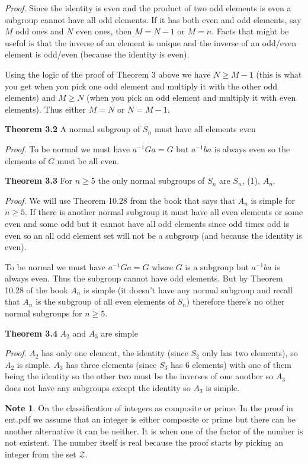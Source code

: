 \documentclass[aps,preprint,preprintnumbers,nofootinbib,showpacs,prd]{revtex4-1}
\begin{document}
{\it Proof}. Since the identity is even and the product of two odd elements is even a subgroup cannot have all odd elements. If it has both even and odd elements, say $M$ odd ones and $N$ even ones, then $M=N-1$ or $M = n$. Facts that might be useful is that the inverse of an element is unique and the inverse of an odd/even element is odd/even (because the identity is even).

Using the logic of the proof of Theorem 3 above we have $N \ge M - 1$ (this is what you get when you pick one odd element and multiply it with the other odd elements) and $M \ge N$ (when you pick an odd element and multiply it with even elements). Thus either $M = N$ or $N = M - 1$.

{\bf Theorem 3.2} A normal subgroup of $S_n$ must have all elements even

{\it Proof}. To be normal we must have $a^{-1}Ga = G$ but $a^{-1}ba$ is always even so the elements of $G$ must be all even.

{\bf Theorem 3.3} For $n \ge 5$ the only normal subgroups of $S_n$ are $S_n$, (1), $A_n$.

{\it Proof}. We will use Theorem 10.28 from the book that says that $A_n$ is simple for $n \ge 5$. If there is another normal subgroup it must have all even elements or some even and some odd but it cannot have all odd elements since odd times odd is even so an all odd element set will not be a subgroup (and because the identity is even).

To be normal we must have $a^{-1} G a = G$ where $G$ is a subgroup but $a^{-1} b a$ is always even. Thus the subgroup cannot have odd elements. But by Theorem 10.28 of the book $A_n$ is simple (it doesn't have any normal subgroup and recall that $A_n$ is the subgroup of all even elements of $S_n$) therefore there's no other normal subgroups for $n \ge 5$.

{\bf Theorem 3.4} $A_2$ and $A_3$ are simple

{\it Proof}. $A_2$ has only one element, the identity (since $S_2$ only has two elements), so $A_2$ is simple. $A_3$ has three elements (since $S_3$ has 6 elements) with one of them being the identity so the other two must be the inverses of one another so $A_3$ does not have any subgroups except the identity so $A_3$ is simple.




{\bf Note 1}. On the classification of integers as composite or prime. In the proof in ent.pdf we assume that an integer is either composite or prime but there can be another alternative it can be neither. It is when one of the factor of the number is not existent. The number itself is real because the proof starts by picking an integer from the set $\mathcal{Z}$.
\end{document}

